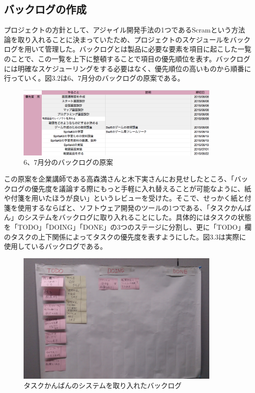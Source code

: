 \documentclass[openany,11pt,papersize]{jsbook}
\begin{document}
\subsection{バックログの作成}
\par プロジェクトの方針として、アジャイル開発手法の1つであるScramという方法論を取り入れることに決まっていたため、プロジェクトのスケジュールをバックログを用いて管理した。バックログとは製品に必要な要素を項目に起こした一覧のことで、この一覧を上下に整頓することで項目の優先順位を表す。バックログには明確なスケジューリングをする必要はなく、優先順位の高いものから順番に行っていく。図3.2は6、7月分のバックログの原案である。

\begin{figure}[H]
\begin{center}
\includegraphics[width=10cm, bb=0 0 1020 359]{img/SprintBacklog.png}
\end{center}
\caption{6、7月分のバックログの原案}
\end{figure}

\par この原案を企業講師である高森満さんと木下実さんにお見せしたところ、「バックログの優先度を議論する際にもっと手軽に入れ替えることが可能なように、紙や付箋を用いたほうが良い」というレビューを受けた。そこで、せっかく紙と付箋を使用するならばと、ソフトウェア開発のツールの1つである、「タスクかんばん」のシステムをバックログに取り入れることにした。具体的にはタスクの状態を「TODO」「DOING」「DONE」の3つのステージに分割し、更に「TODO」欄のタスクの上下関係によってタスクの優先度を表すようにした。図3.3は実際に使用しているバックログである。

\begin{figure}[H]
\begin{center}
\includegraphics[width=10cm, bb=0 0 1206 783]{img/TaskKanban.png}
\end{center}
\caption{タスクかんばんのシステムを取り入れたバックログ}
\end{figure}
\end{document}
